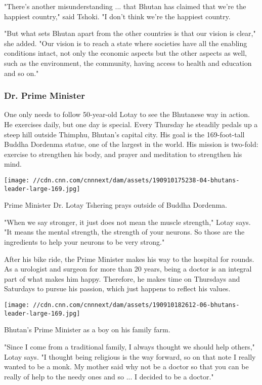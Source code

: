 "There's another misunderstanding ... that Bhutan has claimed that we're
the happiest country," said Tshoki. "I don't think we're the happiest
country.

"But what sets Bhutan apart from the other countries is that our vision
is clear," she added. "Our vision is to reach a state where societies
have all the enabling conditions intact, not only the economic aspects
but the other aspects as well, such as the environment, the community,
having access to health and education and so on."

\hypertarget{dr-prime-minister}{%
\subsubsection{Dr. Prime Minister}\label{dr-prime-minister}}

One only needs to follow 50-year-old Lotay to see the Bhutanese way in
action. He exercises daily, but one day is special. Every Thursday he
steadily pedals up a steep hill outside Thimphu, Bhutan's capital city.
His goal is the 169-foot-tall Buddha Dordenma statue, one of the largest
in the world. His mission is two-fold: exercise to strengthen his body,
and prayer and meditation to strengthen his mind.

\texttt{[image: //cdn.cnn.com/cnnnext/dam/assets/190910175238-04-bhutans-leader-large-169.jpg]}

Prime Minister Dr. Lotay Tshering prays outside of Buddha Dordenma.

"When we say stronger, it just does not mean the muscle strength," Lotay
says. "It means the mental strength, the strength of your neurons. So
those are the ingredients to help your neurons to be very strong."

After his bike ride, the Prime Minister makes his way to the hospital
for rounds. As a urologist and surgeon for more than 20 years, being a
doctor is an integral part of what makes him happy. Therefore, he makes
time on Thursdays and Saturdays to pursue his passion, which just
happens to reflect his values.

\texttt{[image: //cdn.cnn.com/cnnnext/dam/assets/190910182612-06-bhutans-leader-large-169.jpg]}

Bhutan's Prime Minister as a boy on his family farm.

"Since I come from a traditional family, I always thought we should help
others," Lotay says. "I thought being religious is the way forward, so
on that note I really wanted to be a monk. My mother said why not be a
doctor so that you can be really of help to the needy ones and so ... I
decided to be a doctor."

